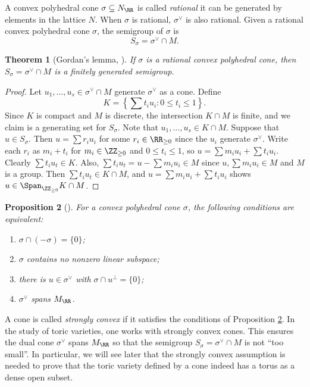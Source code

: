 \documentclass[12pt]{amsart}
\theoremstyle{plain}
\newtheorem{theorem}{Theorem}%
\newtheorem{proposition}[theorem]{Proposition}
\begin{document}
A convex polyhedral cone $\sigma \subseteq N_\RR$ is called \emph{rational} it can be generated by elements in the lattice $N$.
When $\sigma$ is rational, $\sigma^\vee$ is also rational.
Given a rational convex polyhedral cone $\sigma$, the semigroup of $\sigma$ is
$$S_\sigma = \sigma^\vee \cap M.$$

\begin{theorem}[Gordan's lemma, {\cite[\S 1.2]{Fulton93}}]\label{gordanslemma}
If $\sigma$ is a rational convex polyhedral cone, then $S_\sigma = \sigma^\vee \cap M$ is a finitely generated semigroup.
\end{theorem}
\begin{proof}
Let $u_1, \ldots, u_s \in \sigma^\vee \cap M$ generate $\sigma^\vee$ as a cone.
Define
$$K = \left\{\sum t_i u_i : 0 \le t_i \le 1\right\}.$$
Since $K$ is compact and $M$ is discrete, the intersection $K \cap M$ is finite, and we claim is a generating set for $S_\sigma$.
Note that $u_1, \ldots, u_s \in K \cap M$.
Suppose that $u \in S_\sigma$.
Then $u = \sum r_i u_i$ for some $r_i \in \RR_{\ge 0}$ since the $u_i$ generate $\sigma^\vee$.
Write each $r_i$ as $m_i + t_i$ for $m_i \in \ZZ_{\ge 0}$ and $0 \le t_i \le 1$, so $u = \sum m_i u_i + \sum t_i u_i$.
Clearly $\sum t_i u_t \in K$.
Also, $\sum t_i u_t = u - \sum m_i u_i \in M$ since $u, \sum m_i u_i \in M$ and $M$ is a group.
Then $\sum t_i u_t \in K \cap M$, and $u = \sum m_i u_i + \sum t_i u_i$ shows $u \in \Span_{\ZZ_{\ge 0}} K \cap M$.
\end{proof}

\begin{proposition}[{\cite[\S 1.2, Proposition 3]{Fulton93}}]\label{stronglyconvexprop}
For a convex polyhedral cone $\sigma$, the following conditions are equivalent:
\begin{enumerate}
\item $\sigma \cap (-\sigma) = \{0\}$;
\item $\sigma$ contains no nonzero linear subspace;
\item there is $u \in \sigma^\vee$ with $\sigma \cap u^\perp = \{0\}$;
\item $\sigma^\vee$ spans $M_\RR$.
\end{enumerate}
\end{proposition}

A cone is called \emph{strongly convex} if it satisfies the conditions of Proposition \ref{stronglyconvexprop}.
In the study of toric varieties, one works with strongly convex cones.
This ensures the dual cone $\sigma^\vee$ spans $M_\RR$ so that the semigroup $S_\sigma = \sigma^\vee \cap M$ is not ``too small''.
In particular, we will see later that the strongly convex assumption is needed to prove that the toric variety defined by a cone indeed has a torus as a dense open subset.
\end{document}
